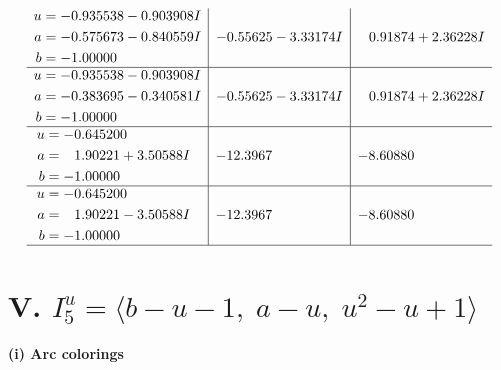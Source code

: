 \documentclass[1p]{elsarticle_modified}
\theoremstyle{definition}
\begin{document}
$$\begin{array}{c|c|c}
\begin{aligned}
u &= -0.935538 - 0.903908 I \\
a &= -0.575673 - 0.840559 I \\
b &= -1.00000\phantom{ +0.000000I}\end{aligned}
 & -0.55625 - 3.33174 I & \phantom{-}0.91874 + 2.36228 I \\ \hline\begin{aligned}
u &= -0.935538 - 0.903908 I \\
a &= -0.383695 - 0.340581 I \\
b &= -1.00000\phantom{ +0.000000I}\end{aligned}
 & -0.55625 - 3.33174 I & \phantom{-}0.91874 + 2.36228 I \\ \hline\begin{aligned}
u &= -0.645200\phantom{ +0.000000I} \\
a &= \phantom{-}1.90221 + 3.50588 I \\
b &= -1.00000\phantom{ +0.000000I}\end{aligned}
 & -12.3967\phantom{ +0.000000I} & -8.60880\phantom{ +0.000000I} \\ \hline\begin{aligned}
u &= -0.645200\phantom{ +0.000000I} \\
a &= \phantom{-}1.90221 - 3.50588 I \\
b &= -1.00000\phantom{ +0.000000I}\end{aligned}
 & -12.3967\phantom{ +0.000000I} & -8.60880\phantom{ +0.000000I}\\
 \hline 
 \end{array}$$\newpage\newpage\renewcommand{\arraystretch}{1}
\centering \section*{V. $I^u_{5}= \langle b- u-1,\;a- u,\;u^2- u+1 \rangle$}
\flushleft \textbf{(i) Arc colorings}\\
\end{document}
